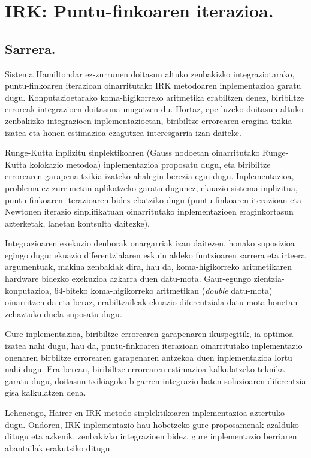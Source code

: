 \chapter{IRK: Puntu-finkoaren iterazioa.}
\label{chap:IRK-PF}

\section{Sarrera.}


Sistema Hamiltondar ez-zurrunen doitasun altuko zenbakizko integraziotarako, puntu-finkoaren iterazioan oinarritutako IRK metodoaren inplementazioa garatu dugu. Konputazioetarako koma-higikorreko aritmetika erabiltzen denez, biribiltze erroreak integrazioen doitasuna mugatzen du. Hortaz, epe luzeko doitasun altuko zenbakizko integrazioen inplementazioetan, biribiltze errorearen eragina txikia izatea eta honen estimazioa ezagutzea interesgarria izan daiteke. 

Runge-Kutta inplizitu sinplektikoaren (Gauss nodoetan oinarritutako Runge-Kutta kolokazio metodoa) inplementazioa proposatu dugu, eta biribiltze errorearen garapena txikia izateko ahalegin berezia egin dugu. Inplementazioa, problema ez-zurrunetan aplikatzeko garatu dugunez, ekuazio-sistema inplizitua, puntu-finkoaren iterazioaren bidez ebatziko dugu (puntu-finkoaren iterazioan eta Newtonen iterazio sinplifikatuan oinarritutako inplementazioen eraginkortasun azterketak, \cite{Hairer2006,JMSanz-Serna1994} lanetan kontsulta daitezke).

Integrazioaren exekuzio denborak onargarriak izan daitezen, honako suposizioa egingo dugu: ekuazio diferentzialaren eskuin aldeko funtzioaren sarrera eta irteera argumentuak, makina zenbakiak dira, hau da, koma-higikorreko aritmetikaren hardware bidezko exekuzioa azkarra duen datu-mota. Gaur-egungo zientzia-konputazioa,  $64$-biteko koma-higikorreko aritmetikan (\emph{double} datu-mota) oinarritzen da eta beraz, erabiltzaileak ekuazio diferentziala datu-mota honetan zehaztuko duela suposatu dugu.

Gure inplementazioa, biribiltze errorearen garapenaren ikuspegitik, ia optimoa izatea nahi dugu, hau da, puntu-finkoaren iterazioan oinarritutako inplementazio onenaren birbiltze errorearen garapenaren antzekoa duen inplementazioa lortu nahi dugu. Era berean, biribiltze errorearen estimazioa kalkulatzeko teknika garatu dugu, doitasun txikiagoko bigarren integrazio baten soluzioaren diferentzia gisa kalkulatzen dena. 
 
 
Lehenengo, Hairer-en IRK metodo sinplektikoaren inplementazioa  \cite{Hairer2008} aztertuko dugu. Ondoren, IRK inplementazio hau hobetzeko gure proposamenak azalduko ditugu eta azkenik, zenbakizko integrazioen bidez, gure inplementazio berriaren abantailak erakutsiko ditugu.

